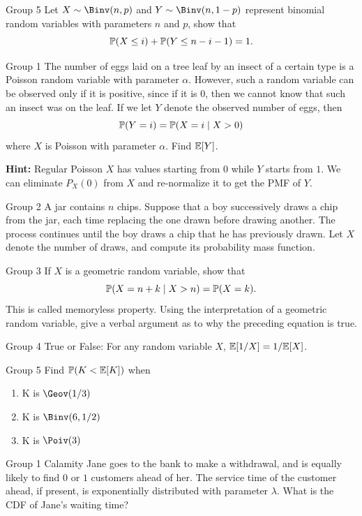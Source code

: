 \documentclass{article}
\begin{document}
\begin{problem}
    {Group 5}
    Let $X\sim\Binv(n,p)$ and $Y\sim\Binv(n,1-p)$ represent binomial random variables with parameters $n$ and $p$, show that
    \[\P{X\leq i}+\P{Y\leq n-i-1}=1.\]
\end{problem}
\begin{problem}
    {Group 1}
    The number of eggs laid on a tree leaf by an insect of a certain type is a Poisson random variable with parameter $\alpha$. However, such a random variable can be observed only if it is positive, since if it is $0$, then we cannot know that such an insect was on the leaf. If we let $Y$ denote the observed number of eggs, then
    \[\P{Y=i}=\condP{X=i}{X>0}\]
    where $X$ is Poisson with parameter $\alpha$. Find $\E{Y}$.

    \textbf{Hint:} Regular Poisson $X$ has values starting from $0$ while $Y$ starts from $1$. We can eliminate $P_X(0)$ from $X$ and re-normalize it to get the PMF of $Y$.
\end{problem}

\begin{problem}
    {Group 2}
    A jar contains $n$ chips. Suppose that a boy successively draws a chip from the jar, each time replacing the one drawn before drawing another. The process continues until the boy draws a chip that he has previously drawn. Let $X$ denote the number of draws, and compute its probability mass function.
\end{problem}

\begin{problem}
    {Group 3}
    If $X$ is a geometric random variable, show that
    \[\condP{X = n + k}{X > n} = \P{X = k}.\]
    This is called memoryless property. Using the interpretation of a geometric random variable, give a verbal argument as to why the preceding equation is true.
\end{problem}

\begin{problem}
    {Group 4}
    True or False: For any random variable $X$, $\E{1/X}=1/\E{X}$.
\end{problem}

\begin{problem}
    {Group 5}
    Find $\P{K<\E{K}}$ when
    \begin{enumerate}
        \item K is $\Geov(1/3)$
        \item K is $\Binv(6, 1/2)$
        \item K is $\Poiv(3)$
    \end{enumerate}
\end{problem}
\begin{problem}
    {Group 1}
    Calamity Jane goes to the bank to make a withdrawal, and is equally likely to find $0$ or $1$ customers ahead of her. The service time of the customer ahead, if present, is exponentially distributed with parameter $\lambda$. What is the CDF of Jane's waiting time?
\end{problem}
\end{document}
